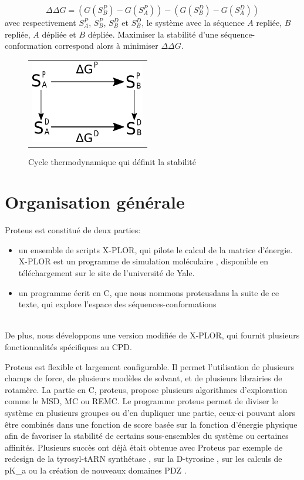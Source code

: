 \begin{equation}
  \label{deltaG}
\Delta \Delta G = (G(S^P_B)- G(S^P_A)) - (G(S^D_B)- G(S^D_A))
\end{equation}  
avec respectivement $S^P_A$, $S^P_B$, $S^D_B$ et $S^D_B$, le système avec la séquence $A$ repliée, $B$ repliée, $A$ dépliée et $B$ dépliée. Maximiser la stabilité d'une séquence-conformation correspond alors à minimiser $\Delta \Delta G$.

   \begin{figure}[!htbp]
     \centering
     \begin{tabular}{c}
       \includegraphics[width=5cm]{figure/cycleThermo.png}
     \end{tabular}
     
     \caption{Cycle thermodynamique qui définit la stabilité}
\label{fig:cycleThermo}
   \end{figure}


\section{Organisation générale}

Proteus est constitué de deux parties:

\begin{itemize}
\item un ensemble de scripts X-PLOR, qui pilote le calcul de la matrice d'énergie. X-PLOR est un programme de simulation moléculaire \cite{Brünger92}, disponible en téléchargement sur le site de l'université de Yale.
\item un programme écrit en C, que nous nommons \og proteus\fg dans la suite de ce texte, qui explore l'espace des séquences-conformations
\end{itemize}\\
De plus, nous développons une version modifiée de X-PLOR, qui fournit plusieurs fonctionnalités spécifiques au CPD.

Proteus est flexible et largement configurable. Il permet l'utilisation de plusieurs champs de force, de plusieurs modèles de solvant, et de plusieurs librairies de rotamère. La partie en C, proteus, propose plusieurs algorithmes d'exploration comme le MSD, MC ou REMC. Le programme proteus permet de diviser le système en plusieurs groupes ou d'en dupliquer une partie, ceux-ci pouvant alors être combinés dans une fonction de score basée sur la fonction d'énergie physique afin de favoriser la stabilité de certains sous-ensembles du système ou certaines affinités. Plusieurs succès ont déjà était obtenue avec Proteus par exemple de redesign de la tyrosyl-tARN synthétase \cite{Simonson16}, sur la D-tyrosine \cite{Druart17}, sur les calculs de pK_a \cite{Villa17} ou la création de nouveaux domaines PDZ \cite{Mignon17}.

